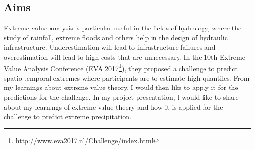 \documentclass[a4paper,10pt]{article}
\theoremstyle{definition}
\begin{document}
\subsection*{Aims}
Extreme value analysis is particular useful in the fields of hydrology, where the study of rainfall, extreme floods and others help in the design of hydraulic infrastructure. Underestimation will lead to infrastructure failures and overestimation will lead to high costs that are unnecessary. In the 10th Extreme Value Analysis Conference (EVA 2017\footnote{\url{http://www.eva2017.nl/Challenge/index.html}}), they proposed a challenge to predict spatio-temporal extremes where participants are to estimate high quantiles. From my learnings about extreme value theory, I would then like to apply it for the predictions for the challenge. In my project presentation, I would like to share about my learnings of extreme value theory and how it is applied for the challenge to predict extreme precipitation. 

\end{document}
